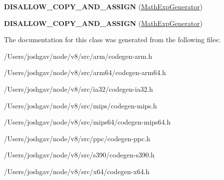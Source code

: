 \begin{DoxyCompactItemize}
\item 
{\bfseries D\+I\+S\+A\+L\+L\+O\+W\+\_\+\+C\+O\+P\+Y\+\_\+\+A\+N\+D\+\_\+\+A\+S\+S\+I\+GN} (\hyperlink{classv8_1_1internal_1_1_math_exp_generator}{Math\+Exp\+Generator})\hypertarget{classv8_1_1internal_1_1_math_exp_generator_a27d4e20d226bf3df9fb79e57eb4ffb5f}{}\label{classv8_1_1internal_1_1_math_exp_generator_a27d4e20d226bf3df9fb79e57eb4ffb5f}

\item 
{\bfseries D\+I\+S\+A\+L\+L\+O\+W\+\_\+\+C\+O\+P\+Y\+\_\+\+A\+N\+D\+\_\+\+A\+S\+S\+I\+GN} (\hyperlink{classv8_1_1internal_1_1_math_exp_generator}{Math\+Exp\+Generator})\hypertarget{classv8_1_1internal_1_1_math_exp_generator_a27d4e20d226bf3df9fb79e57eb4ffb5f}{}\label{classv8_1_1internal_1_1_math_exp_generator_a27d4e20d226bf3df9fb79e57eb4ffb5f}

\end{DoxyCompactItemize}


The documentation for this class was generated from the following files\+:\begin{DoxyCompactItemize}
\item 
/\+Users/joshgav/node/v8/src/arm/codegen-\/arm.\+h\item 
/\+Users/joshgav/node/v8/src/arm64/codegen-\/arm64.\+h\item 
/\+Users/joshgav/node/v8/src/ia32/codegen-\/ia32.\+h\item 
/\+Users/joshgav/node/v8/src/mips/codegen-\/mips.\+h\item 
/\+Users/joshgav/node/v8/src/mips64/codegen-\/mips64.\+h\item 
/\+Users/joshgav/node/v8/src/ppc/codegen-\/ppc.\+h\item 
/\+Users/joshgav/node/v8/src/s390/codegen-\/s390.\+h\item 
/\+Users/joshgav/node/v8/src/x64/codegen-\/x64.\+h\end{DoxyCompactItemize}
